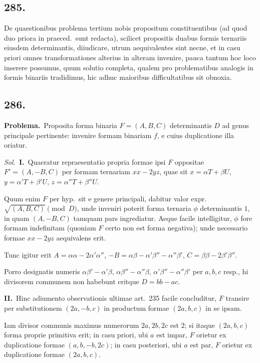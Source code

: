 \documentclass[12pt,a4paper]{article}
\theoremstyle{plain}
\theoremstyle{definition}
\theoremstyle{remark}
\begin{document}
\subsection*{285.}

De quaestionibus problema tertium nobis propositum constituentibus (ad quod duo priora in praeced.\ sunt redacta), scilicet propositis duabus formis ternariis eiusdem determinantis, diiudicare, utrum aequivalentes sint necne, et in casu priori omnes transformationes alterius in alteram invenire, pauca tantum hoc loco inserere possumus, quum solutio completa, qualem pro problematibus analogis in formis binariis tradidimus, hic adhuc maioribus difficultatibus sit obnoxia.

\subsection*{286.}

\textbf{Problema.}\ Proposita forma binaria $F = (A, B, C)$ determinantis $D$ ad genus principale pertinente: invenire formam binariam $f$, e cuius duplicatione illa oriatur.

\textit{Sol.}\ \textbf{I.}\ Quaeratur repraesentatio propria formae ipsi $F$ oppositae $F' = (A, -B, C)$ per formam ternariam $xx - 2yz$, quae sit $x = \alpha T + \beta U$, $y = \alpha' T + \beta' U$, $z = \alpha'' T + \beta'' U$.

Quum enim $F$ per hyp.\ sit e genere principali, dabitur valor expr.\ $\sqrt{(A, B, C)} \pmod{D}$, unde inveniri poterit forma ternaria $\phi$ determinantis $1$, in quam $(A, -B, C)$ tamquam pars ingrediatur. Aeque facile intelligitur, $\phi$ fore formam indefinitam (quoniam $F$ certo non est forma negativa); unde necessario formae $xx - 2yz$ aequivalens erit.

Tunc igitur erit $A = \alpha\alpha - 2\alpha'\alpha''$, $-B = \alpha\beta - \alpha'\beta'' - \alpha''\beta'$, $C = \beta\beta - 2\beta'\beta''$.

Porro designatis numeris $\alpha\beta' - \alpha'\beta$, $\alpha\beta'' - \alpha''\beta$, $\alpha'\beta'' - \alpha''\beta'$ per $a, b, c$ resp., hi divisorem communem non habebunt eritque $D = bb - ac$.

\textbf{II.}\ Hinc adiumento observationis ultimae art.\ 235 facile concluditur, $F$ transire per substitutionem $(2a, -b, c)$ in productum formae $(2a, b, c)$ in se ipsam.

Iam divisor communis maximus numerorum $2a, 2b, 2c$ est $2$; si itaque $(2a, b, c)$ forma proprie primitiva erit; in casu priori, ubi $a$ est impar, $F$ orietur ex duplicatione formae $(a, b, -b, 2c)$; in casu posteriori, ubi $a$ est par, $F$ orietur ex duplicatione formae $(2a, b, c)$.
\end{document}
